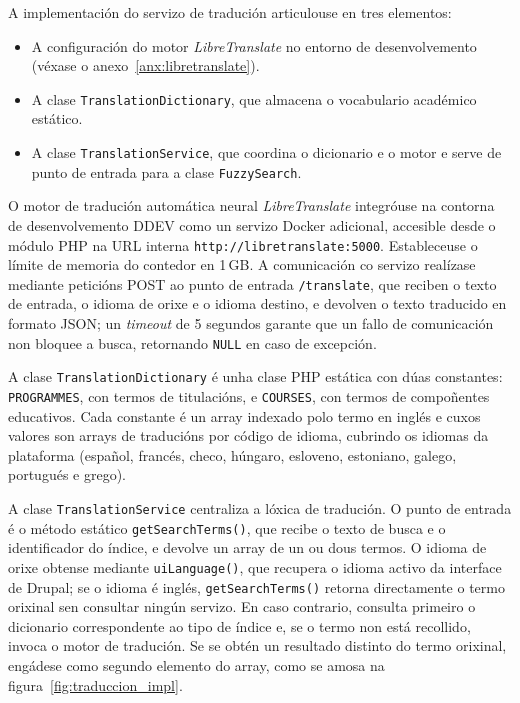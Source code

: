 \documentclass[%
    a4paper,               %
    twoside,               %
    10pt,                  %
]{article}                 %
\begin{document}
A implementación do servizo de tradución articulouse en tres elementos:
\begin{itemize}
    \item A configuración do motor \textit{LibreTranslate} \cite{libretranslate} no entorno de desenvolvemento (véxase o anexo~\ref{anx:libretranslate}).
    \item A clase \texttt{TranslationDictionary}, que almacena o vocabulario académico estático.
    \item A clase \texttt{TranslationService}, que coordina o dicionario e o motor e serve de punto de entrada para a clase \texttt{FuzzySearch}.
\end{itemize}

O motor de tradución automática neural \textit{LibreTranslate} integróuse na contorna de desenvolvemento DDEV como un servizo Docker adicional, accesible desde o módulo PHP na URL interna \texttt{http://libretranslate:5000}. Estableceuse o límite de memoria do contedor en 1\,GB. A comunicación co servizo realízase mediante peticións POST ao punto de entrada \texttt{/translate}, que reciben o texto de entrada, o idioma de orixe e o idioma destino, e devolven o texto traducido en formato JSON; un \textit{timeout} de 5 segundos garante que un fallo de comunicación non bloquee a busca, retornando \texttt{NULL} en caso de excepción.

A clase \texttt{TranslationDictionary} é unha clase PHP estática con dúas constantes: \texttt{PROGRAMMES}, con termos de titulacións, e \texttt{COURSES}, con termos de compoñentes educativos. Cada constante é un array indexado polo termo en inglés e cuxos valores son arrays de traducións por código de idioma, cubrindo os idiomas da plataforma (español, francés, checo, húngaro, esloveno, estoniano, galego, portugués e grego).

A clase \texttt{TranslationService} centraliza a lóxica de tradución. O punto de entrada é o método estático \texttt{getSearchTerms()}, que recibe o texto de busca e o identificador do índice, e devolve un array de un ou dous termos. O idioma de orixe obtense mediante \texttt{uiLanguage()}, que recupera o idioma activo da interface de Drupal; se o idioma é inglés, \texttt{getSearchTerms()} retorna directamente o termo orixinal sen consultar ningún servizo. En caso contrario, consulta primeiro o dicionario correspondente ao tipo de índice e, se o termo non está recollido, invoca o motor de tradución. Se se obtén un resultado distinto do termo orixinal, engádese como segundo elemento do array, como se amosa na figura~\ref{fig:traduccion_impl}.
\end{document}

